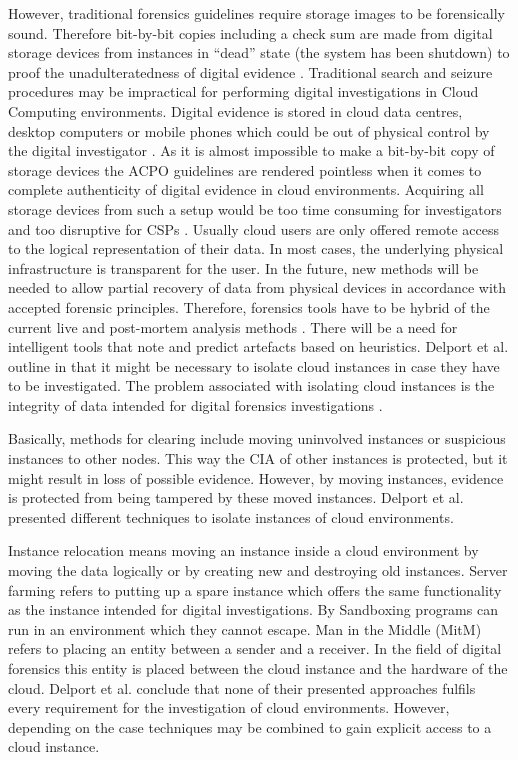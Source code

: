 \documentclass[runningheads,a4paper]{llncs}
\begin{document}
However, traditional forensics guidelines require storage images to be forensically sound. Therefore bit-by-bit copies including a check sum are made from digital storage devices from instances in ``dead'' state (the system has been shutdown) to proof the unadulteratedness of digital evidence \cite{acpo-guidelines}. Traditional search and seizure procedures may be impractical for performing digital investigations in Cloud Computing environments. Digital evidence is stored in cloud data centres, desktop computers or mobile phones which could be out of physical control by the digital investigator \cite{Taylor2011}. As it is almost impossible to make a bit-by-bit copy of storage devices \cite{Zimmerman2011} the ACPO guidelines are rendered pointless when it comes to complete authenticity of digital evidence in cloud environments. Acquiring all storage devices from such a setup would be too time consuming for investigators and too disruptive for CSPs \cite{Grispos2011}. Usually cloud users are only offered remote access to the logical representation of their data. In most cases, the underlying physical infrastructure is transparent for the user. In the future, new methods will be needed to allow partial recovery of data from physical devices in accordance with accepted forensic principles. Therefore, forensics tools have to be hybrid of the current live and post-mortem analysis methods \cite{Zimmerman2011}. There will be a need for intelligent tools that note and predict artefacts based on heuristics. Delport et al. outline in \cite{Delport2011} that it might be necessary to isolate cloud instances in case they have to be investigated. The problem associated with isolating cloud instances is the integrity of data intended for digital forensics investigations \cite{Biggs2009}. 

Basically, methods for clearing include moving uninvolved instances or suspicious instances to other nodes. This way the CIA of other instances is protected, but it might result in loss of possible evidence. However, by moving instances, evidence is protected from being tampered by these moved instances. Delport et al. \cite{Delport2011} presented different techniques to isolate instances of cloud environments. 

Instance relocation means moving an instance inside a cloud environment by moving the data logically or by creating new and destroying old instances. Server farming refers to putting up a spare instance which offers the same functionality as the instance intended for digital investigations. By Sandboxing programs can run in an environment which they cannot escape. Man in the Middle (MitM) refers to placing an entity between a sender and a receiver. In the field of digital forensics this entity is placed between the cloud instance and the hardware of the cloud. Delport et al. \cite{Delport2011} conclude that none of their presented approaches fulfils every requirement for the investigation of cloud environments. However, depending on the case techniques may be combined to gain explicit access to a cloud instance. 
\end{document}
